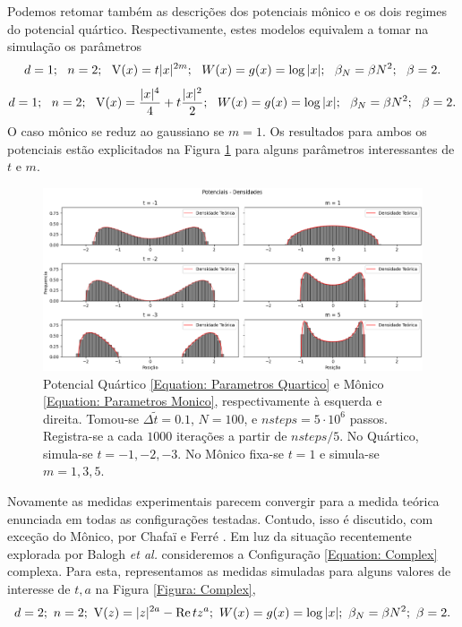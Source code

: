 \documentclass[12pt]{report}
\begin{document}
Podemos retomar também as descrições dos potenciais mônico e os dois regimes do potencial quártico. Respectivamente, estes modelos equivalem a tomar na simulação os parâmetros
\begin{equation}
	d = 1; \ \  n = 2; \ \ \V(x)= t |x|^{2m}; \ \ W(x) = g(x) = \log{|x|}; \ \ \beta_N = \beta N^2; \ \ \beta = 2.
	\label{Equation: Parametros Monico}
\end{equation}
\begin{equation}
	d = 1; \ \  n = 2; \ \ \V(x)=\frac{|x|^4}{4} + t \frac{|x|^2}{2}; \ \ W(x) = g(x) = \log{|x|}; \ \ \beta_N = \beta N^2; \ \ \beta = 2.
	\label{Equation: Parametros Quartico}
\end{equation}
O caso mônico se reduz ao gaussiano se $m=1$. Os resultados para ambos os potenciais estão explicitados na Figura \ref{Figura: Quartic Monic} para alguns parâmetros interessantes de $t$ e $m$.
\begin{figure}[ht!]
	\centering
	\includegraphics[width=\textwidth]{Assets/validationQuarticMonic-alt.png}
	\caption{Potencial Quártico \eqref{Equation: Parametros Quartico} e Mônico \eqref{Equation: Parametros Monico}, respectivamente à esquerda e direita. Tomou-se $\Delta \tilde{t} = 0.1$, $N=100$, e $nsteps = 5\cdot10^6$ passos. Registra-se a cada $1000$ iterações a partir de $nsteps/5$. No Quártico, simula-se $t=-1,-2,-3$. No Mônico fixa-se $t=1$ e simula-se $m=1,3,5$.}
	\label{Figura: Quartic Monic}
\end{figure}

Novamente as medidas experimentais parecem convergir para a medida teórica enunciada em todas as configurações testadas. Contudo, isso é discutido, com exceção do Mônico, por Chafa\"{i} e Ferré \cite{Chafa2018}. Em luz da situação recentemente explorada por Balogh \textit{et al.} \cite{balogh2016orthogonal} consideremos a Configuração \eqref{Equation: Complex} complexa. Para esta, representamos as medidas simuladas para alguns valores de interesse de $t, a$ na Figura \ref{Figura: Complex},
\begin{equation}
	d = 2; \  n = 2; \  \operatorname{V}(z)=|z|^{2a} - \mathop{\rm Re}{t z^a};  \ W(x) = g(x) = \log{|x|};  \ \beta_N = \beta N^2;  \ \beta = 2.
	\label{Equation: Complex}
\end{equation}
\end{document}
